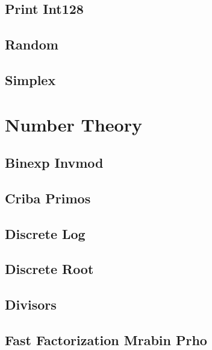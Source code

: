 \documentclass[9pt,portrait,twocolumn,a4paper,notitlepage]{article}
\newcommand\cppfile[2][]{%
\ifstrempty{#1}{}{}%
}
\begin{document}
\subsection{Print Int128}
\cppfile{math_clean/print_int128.cpp}

\subsection{Random}
\cppfile{math_clean/random.cpp}

\subsection{Simplex}
\cppfile{math_clean/simplex.cpp}


\section{Number Theory}

\subsection{Binexp Invmod}
\cppfile{number_theory_clean/binexp_invmod.cpp}

\subsection{Criba Primos}
\cppfile{number_theory_clean/criba_primos.cpp}

\subsection{Discrete Log}
\cppfile{number_theory_clean/discrete_log.cpp}

\subsection{Discrete Root}
\cppfile{number_theory_clean/discrete_root.cpp}

\subsection{Divisors}
\cppfile{number_theory_clean/divisors.cpp}

\subsection{Fast Factorization Mrabin Prho}
\cppfile{number_theory_clean/fast_factorization_mrabin_prho.cpp}
\end{document}
